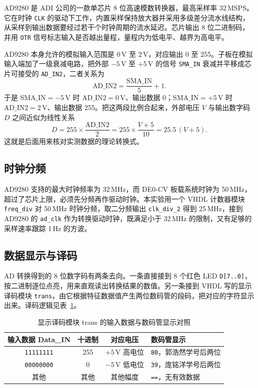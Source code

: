 \documentclass[12pt]{ctexart}
\begin{document}
AD9280 是 ADI 公司的一款单芯片 8 位高速模数转换器，最高采样率 32\,MSPS。它在时钟 \texttt{CLK} 的驱动下工作，内置采样保持放大器并采用多级差分流水线结构，从采样到输出数据要经过若干个时钟周期的流水延迟。芯片输出 8 位二进制码，并用 \texttt{OTR} 信号标志输入是否越出量程，量程内为低电平、越界为高电平。

AD9280 本身允许的模拟输入范围是 $0\,$V 至 $2\,$V，对应输出 0 至 255。子板在模拟输入端加了一级衰减电路，把外部 $-5\,$V 至 $+5\,$V 的信号 \texttt{SMA\_IN} 衰减并平移成芯片可接受的 \texttt{AD\_IN2}，二者关系为
\[
    \mathrm{AD\_IN2} = \frac{\mathrm{SMA\_IN}}{5} + 1 .
\]
于是 $\mathrm{SMA\_IN} = -5\,$V 时 $\mathrm{AD\_IN2} = 0\,$V、输出数据 0；$\mathrm{SMA\_IN} = +5\,$V 时 $\mathrm{AD\_IN2} = 2\,$V、输出数据 255。把这两段比例合起来，外部电压 $V$ 与输出数字码 $D$ 之间近似为线性关系
\[
    D = 255 \times \frac{\mathrm{AD\_IN2}}{2}
      = 255 \times \frac{V + 5}{10}
      = 25.5\,(V + 5).
\]
这就是后面用来核对实测数据的理论转换式。

\subsection{时钟分频}

AD9280 支持的最大时钟频率为 32\,MHz，而 DE0-CV 板载系统时钟为 50\,MHz，超过了芯片上限，必须先分频再作驱动时钟。本实验用一个 VHDL 计数器模块 \texttt{freq\_div} 对 50\,MHz 时钟分频，取二分频输出 \texttt{clk\_div\_2} 得到 25\,MHz，接到 AD9280 的 \texttt{ad\_clk} 作为转换驱动时钟，既满足小于 32\,MHz 的限制，又有足够的采样速率跟踪 1\,Hz 的方波。

\subsection{数据显示与译码}

AD 转换得到的 8 位数字码有两条去向。一条直接接到 8 个红色 LED \texttt{D[7..0]}，按二进制逐位点亮，用来直观读出转换结果的数值。另一条接到 VHDL 写的显示译码模块 \texttt{trans}，由它根据特征数据值产生两位数码管的段码，把对应的字符显示出来。译码逻辑见表~\ref{tab:trans}。

\begin{table}[H]
    \centering
    \caption{显示译码模块 trans 的输入数据与数码管显示对照}
    \label{tab:trans}
    \begin{tabular}{cccl}
        \toprule
        \textbf{输入数据 Data\_IN} & \textbf{十进制} & \textbf{对应电压} & \textbf{数码管显示} \\
        \midrule
        \texttt{11111111} & 255 & $+5\,$V 高电位 & \texttt{80}，郭浩然学号后两位 \\
        \texttt{00000000} & 0   & $-5\,$V 低电位 & \texttt{39}，庞铭洋学号后两位 \\
        其他 & 其他 & 其他幅度 & \texttt{==}，无有效数据 \\
        \bottomrule
    \end{tabular}
\end{table}
\end{document}
